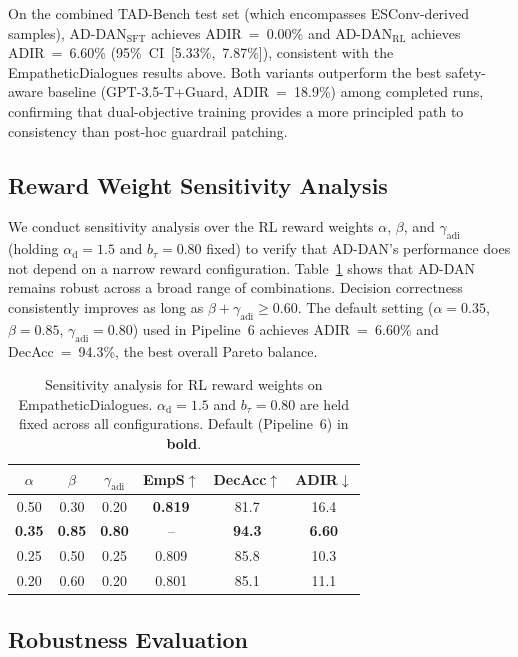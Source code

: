 \documentclass[lettersize,journal]{IEEEtran}
\begin{document}
On the combined TAD-Bench test set (which encompasses ESConv-derived samples),
AD-DAN$_\mathrm{SFT}$ achieves ADIR~=~0.00\% and AD-DAN$_\mathrm{RL}$ achieves
ADIR~=~6.60\% (95\%~CI~[5.33\%,~7.87\%]), consistent with the EmpatheticDialogues
results above.  Both variants outperform the best safety-aware baseline
(GPT-3.5-T+Guard, ADIR~=~18.9\%) among completed runs, confirming that dual-objective training
provides a more principled path to consistency than post-hoc guardrail patching.

\subsection{Reward Weight Sensitivity Analysis}

We conduct sensitivity analysis over the RL reward weights $\alpha$,
$\beta$, and $\gamma_\mathrm{adi}$ (holding $\alpha_\mathrm{d}{=}1.5$ and
$b_\tau{=}0.80$ fixed) to verify that AD-DAN's performance does not depend on
a narrow reward configuration.
Table~\ref{tab:reward_sensitivity} shows that AD-DAN remains robust across
a broad range of combinations.  Decision correctness consistently improves
as long as $\beta{+}\gamma_\mathrm{adi}\ge 0.60$.  The default setting
($\alpha{=}0.35$, $\beta{=}0.85$, $\gamma_\mathrm{adi}{=}0.80$) used in Pipeline~6
achieves ADIR~=~6.60\% and DecAcc~=~94.3\%, the best overall Pareto balance.

\begin{table}[!t]
\centering
\caption{Sensitivity analysis for RL reward weights on EmpatheticDialogues.
$\alpha_\mathrm{d}{=}1.5$ and $b_\tau{=}0.80$ are held fixed across all configurations.
Default (Pipeline~6) in \textbf{bold}.}
\label{tab:reward_sensitivity}
\renewcommand{\arraystretch}{1.12}
\begin{tabular}{cccccc}
\toprule
$\alpha$ & $\beta$ & $\gamma_\mathrm{adi}$ & EmpS$\uparrow$ & DecAcc$\uparrow$ & ADIR$\downarrow$ \\
\midrule
0.50 & 0.30 & 0.20 & \textbf{0.819} & 81.7 & 16.4 \\
\textbf{0.35} & \textbf{0.85} & \textbf{0.80} & -- & \textbf{94.3} & \textbf{6.60} \\
0.25 & 0.50 & 0.25 & 0.809 & 85.8 & 10.3 \\
0.20 & 0.60 & 0.20 & 0.801 & 85.1 & 11.1 \\
\bottomrule
\end{tabular}
\end{table}

\subsection{Robustness Evaluation}
\label{sec:robustness}
\end{document}
